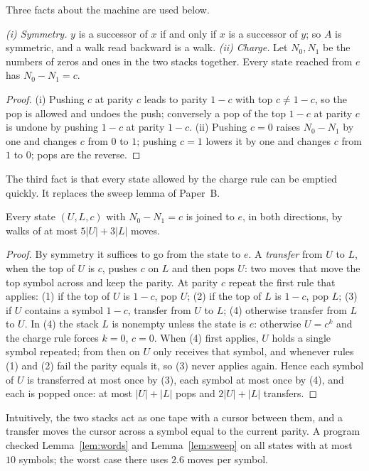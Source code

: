 Three facts about the machine are used below.

\begin{lemma}\label{lem:words}
\emph{(i) Symmetry.} $y$ is a successor of $x$ if and only if $x$ is a successor of $y$; so $A$ is symmetric, and a
walk read backward is a walk.
\emph{(ii) Charge.} Let $N_0,N_1$ be the numbers of zeros and ones in the two stacks together. Every state reached
from $e$ has $N_0-N_1=c$.
\end{lemma}

\begin{proof}
(i) Pushing $c$ at parity $c$ leads to parity $1-c$ with top $c\neq1-c$, so the pop is allowed and undoes the push;
conversely a pop of the top $1-c$ at parity $c$ is undone by pushing $1-c$ at parity $1-c$. (ii) Pushing $c=0$
raises $N_0-N_1$ by one and changes $c$ from $0$ to $1$; pushing $c=1$ lowers it by one and changes $c$ from $1$ to
$0$; pops are the reverse.
\end{proof}

The third fact is that every state allowed by the charge rule can be emptied quickly. It replaces the sweep lemma of
Paper~B.

\begin{lemma}[Sweep]\label{lem:sweep}
Every state $(U,L,c)$ with $N_0-N_1=c$ is joined to $e$, in both directions, by walks of at most $5|U|+3|L|$ moves.
\end{lemma}

\begin{proof}
By symmetry it suffices to go from the state to $e$. A \emph{transfer} from $U$ to $L$, when the top of $U$ is $c$,
pushes $c$ on $L$ and then pops $U$: two moves that move the top symbol across and keep the parity. At parity $c$
repeat the first rule that applies: (1) if the top of $U$ is $1-c$, pop $U$; (2) if the top of $L$ is $1-c$, pop
$L$; (3) if $U$ contains a symbol $1-c$, transfer from $U$ to $L$; (4) otherwise transfer from $L$ to $U$. In (4)
the stack $L$ is nonempty unless the state is $e$: otherwise $U=c^k$ and the charge rule forces $k=0$, $c=0$. When
(4) first applies, $U$ holds a single symbol repeated; from then on $U$ only receives that symbol, and whenever rules
(1) and (2) fail the parity equals it, so (3) never applies again. Hence each symbol of $U$ is transferred at most
once by (3), each symbol at most once by (4), and each is popped once: at most $|U|+|L|$ pops and $2|U|+|L|$
transfers.
\end{proof}

Intuitively, the two stacks act as one tape with a cursor between them, and a transfer moves the cursor across a
symbol equal to the current parity. A program checked Lemma~\ref{lem:words} and Lemma~\ref{lem:sweep} on all states
with at most $10$ symbols; the worst case there uses $2.6$ moves per symbol.
